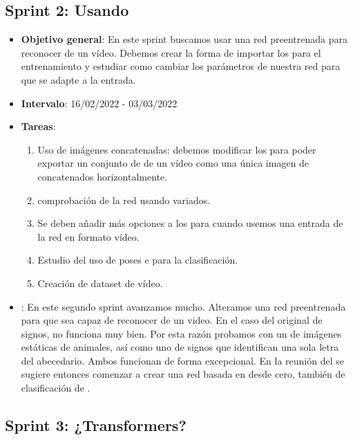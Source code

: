 \subsection{Sprint 2: Usando }

\begin{itemize}
  \item  \textbf{Objetivo general}: En este sprint buscamos usar una red preentrenada para reconocer  de un vídeo. Debemos crear la forma de importar los  para el entrenamiento y estudiar como cambiar los parámetros de nuestra red para que se adapte a la entrada.

  \item \textbf{Intervalo}: 16/02/2022 - 03/03/2022

  \item \textbf{Tareas}:
        \begin{enumerate}
          \item Uso de imágenes concatenadas: debemos modificar los  para poder exportar un conjunto de  de un vídeo como una única imagen de  concatenados horizontalmente.
          \item comprobación de la red usando  variados.
          \item Se deben añadir más opciones a los  para cuando usemos una entrada de la red en formato vídeo.
          \item Estudio del uso de poses e  para la clasificación.
          \item Creación de dataset de vídeo.
        \end{enumerate}

  \item \textbf{}: En este segundo sprint avanzamos mucho. Alteramos una red  preentrenada para que sea capaz de reconocer  de un video. En el caso del  original de signos, no funciona muy bien. Por esta razón probamos con un  de imágenes estáticas de animales, así como uno de signos que identifican una sola letra del abecedario. Ambos funcionan de forma excepcional. En la reunión del  se sugiere entonces comenzar a crear una red basada en  desde cero, también de clasificación de .
\end{itemize}

\subsection{Sprint 3: ¿Transformers?}

